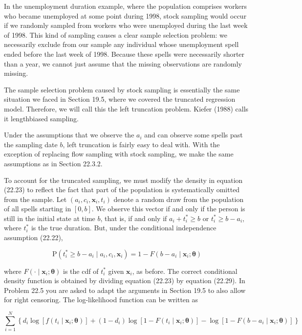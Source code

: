 \documentclass[10pt]{article}
\begin{document}
In the unemployment duration example, where the population comprises workers who became unemployed at some point during 1998, stock sampling would occur if we randomly sampled from workers who were unemployed during the last week of 1998. This kind of sampling causes a clear sample selection problem: we necessarily exclude from our sample any individual whose unemployment spell ended before the last week of 1998. Because these spells were necessarily shorter than a year, we cannot just assume that the missing observations are randomly missing.

The sample selection problem caused by stock sampling is essentially the same situation we faced in Section 19.5, where we covered the truncated regression model. Therefore, we will call this the left truncation problem. Kiefer (1988) calls it lengthbiased sampling.

Under the assumptions that we observe the $a_{i}$ and can observe some spells past the sampling date $b$, left truncation is fairly easy to deal with. With the exception of replacing flow sampling with stock sampling, we make the same assumptions as in Section 22.3.2.

To account for the truncated sampling, we must modify the density in equation (22.23) to reflect the fact that part of the population is systematically omitted from the sample. Let $\left(a_{i}, c_{i}, \mathbf{x}_{i}, t_{i}\right)$ denote a random draw from the population of all spells starting in $[0, b]$. We observe this vector if and only if the person is still in the initial state at time $b$, that is, if and only if $a_{i}+t_{i}^{*} \geq b$ or $t_{i}^{*} \geq b-a_{i}$, where $t_{i}^{*}$ is the true duration. But, under the conditional independence assumption (22.22),


\begin{equation*}
\mathrm{P}\left(t_{i}^{*} \geq b-a_{i} \mid a_{i}, c_{i}, \mathbf{x}_{i}\right)=1-F\left(b-a_{i} \mid \mathbf{x}_{i} ; \boldsymbol{\theta}\right) \tag{22.29}
\end{equation*}


where $F\left(\cdot \mid \mathbf{x}_{i} ; \boldsymbol{\theta}\right)$ is the cdf of $t_{i}^{*}$ given $\mathbf{x}_{i}$, as before. The correct conditional density function is obtained by dividing equation (22.23) by equation (22.29). In Problem 22.5 you are asked to adapt the arguments in Section 19.5 to also allow for right censoring. The log-likelihood function can be written as


\begin{equation*}
\sum_{i=1}^{N}\left\{d_{i} \log \left[f\left(t_{i} \mid \mathbf{x}_{i} ; \boldsymbol{\theta}\right)\right]+\left(1-d_{i}\right) \log \left[1-F\left(t_{i} \mid \mathbf{x}_{i} ; \boldsymbol{\theta}\right)\right]-\log \left[1-F\left(b-a_{i} \mid \mathbf{x}_{i} ; \boldsymbol{\theta}\right)\right]\right\} \tag{22.30}
\end{equation*}
\end{document}
